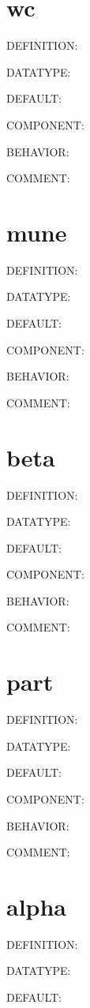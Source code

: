 \section{wc}
{\color{red}DEFINITION:}

{\color{green}DATATYPE:}

{\color{blue}DEFAULT:}

{\color{brown}COMPONENT:}

{\color{purple}BEHAVIOR:}

{\color{olive}COMMENT:}

\section{mune}
{\color{red}DEFINITION:}

{\color{green}DATATYPE:}

{\color{blue}DEFAULT:}

{\color{brown}COMPONENT:}

{\color{purple}BEHAVIOR:}

{\color{olive}COMMENT:}

\section{beta}
{\color{red}DEFINITION:}

{\color{green}DATATYPE:}

{\color{blue}DEFAULT:}

{\color{brown}COMPONENT:}

{\color{purple}BEHAVIOR:}

{\color{olive}COMMENT:}

\section{part}
{\color{red}DEFINITION:}

{\color{green}DATATYPE:}

{\color{blue}DEFAULT:}

{\color{brown}COMPONENT:}

{\color{purple}BEHAVIOR:}

{\color{olive}COMMENT:}

\section{alpha}
{\color{red}DEFINITION:}

{\color{green}DATATYPE:}

{\color{blue}DEFAULT:}

